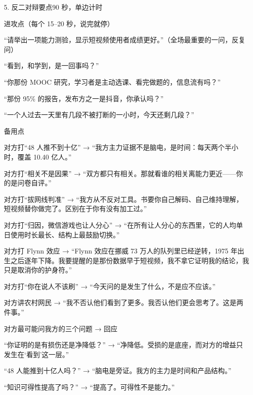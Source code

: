 \documentclass[script,con]{debate}
\begin{document}
\begin{stage}{5. 反二对辩要点}{90 秒，单边计时}
\begin{points}{进攻点（每个 15–20 秒，说完就停）}
\item “请举出一项能力测验，显示短视频使用者成绩更好。”（全场最重要的一问，反复问）
\item “看到，和学到，是一回事吗？”
\item “你那份 MOOC 研究，学习者是主动选课、看完做题的，信息流有吗？”
\item “那份 95\% 的报告，发布方之一是抖音，你承认吗？”
\item “一个人过去一天里有几段不被打断的一小时，今天还剩几段？”
\end{points}
\begin{points}{备用点}
\item 对方打“48 人推不到十亿” → “我方主力证据不是脑电，是时间：每天两个半小时，覆盖 10.40 亿人。”
\item 对方打“相关不是因果” → “双方都只有相关。那就看谁的相关离能力更近——你的是问卷自评。”
\item 对方打“拔网线判准” → “我方从不反对工具。书要你自己解码、自己维持理解，短视频替你做完了。区别在于你有没有加工过。”
\item 对方打“归因，微信游戏也让人分心” → “在所有让人分心的东西里，它的人均单日使用时长最长、结构上最鼓励切换。”
\item 对方打 Flynn 效应 → “Flynn 效应在挪威 73 万人的队列里已经逆转，1975 年出生之后逐年下降。我要提醒的是那份数据早于短视频，我不拿它证明我的结论，我只是取消你的护身符。”
\item 对方打“你在说人不该刷” → “今天问的是发生了什么，不是应不应该。”
\item 对方讲农村网民 → “我不否认他们看到了更多。我否认他们更会思考了。这是两件事。”
\end{points}
\begin{points}{对方最可能问我方的三个问题 → 回应}
\item “你证明的是有损伤还是净降低？” → “净降低。受损的是底座，而对方的增益只发生在‘看到’这一层。”
\item “48 人能推到十亿人吗？” → “脑电是旁证。我方的主力是时间和产品结构。”
\item “知识可得性提高了吗？” → “提高了。可得性不是能力。”
\end{points}
\end{stage}
\end{document}
